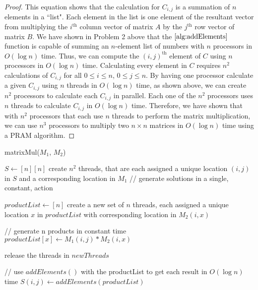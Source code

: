 \documentclass{article}
\renewcommand{\_}{\ifincsname_\else\legacyunderscore\fi}
\begin{document}
\begin{enumerate}
\begin{enumerate}
\begin{proof}
This equation shows that the calculation for $C_{i, j}$ is a summation of $n$ elements in a ``list". Each element in the list is one element of the resultant vector from multiplying the $i^{\text{th}}$ column vector of matrix $A$ by the $j^{\text{th}}$ row vector of matrix $B$. We have shown in Problem 2 above that the $\ref{alg:addElements}$ function is capable of summing an $n$-element list of numbers with $n$ processors in $O(\log n)$ time. Thus, we can compute the $(i, j)^{\text{th}}$ element of $C$ using $n$ processors in $O(\log n)$ time. Calculating every element in $C$ requires $n^2$ calculations of $C_{i, j}$ for all $0\leq i \leq n$, $0 \leq j \leq n$. By having one processor calculate a given $C_{i, j}$ using $n$ threads in $O(\log n)$ time, as shown above, we can create $n^2$ processors to calculate each $C_{i, j}$ in parallel. Each one of the $n^2$ processors uses $n$ threads to calculate $C_{i, j}$ in $O(\log n)$ time. Therefore, we have shown that with $n^2$ processors that each use $n$ threads to perform the matrix multiplication, we can use $n^3$ processors to multiply two $n\times n$ matrices in $O(\log n)$ time using a PRAM algorithm. \end{proof}
	
	
        \begin{function}
            \DontPrintSemicolon
            \caption{matrixMul($M_1$, $M_2$)}
            \label{alg:matrixMul}
            $S \gets [n][n]$\;
            create $n^2$ threads, that are each assigned a unique location $(i, j)$ in $S$ and a corresponding location in $M_1$\;
            \;
            // generate solutions in a single, constant, action\;
            {
                $productList \gets [n]$\;
                create a new set of $n$ threads, each assigned a unique location $x$ in $productList$ with corresponding location in $M_2(i, x)$\;\;

                // generate n products in constant time\;
                {
                    $productList[x] \gets M_1(i,j) * M_2(i, x)$\;
                }\;

                release the threads in $newThreads$\;\;

                // use $addElements()$ with the productList to get each result in $O(\log n)$ time\;
                $S(i, j) \gets addElements(productList)$\;\;
            
            }
            
        \end{function}
    
    \end{enumerate}

\end{enumerate}
\end{document}

